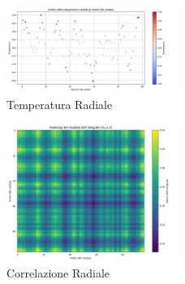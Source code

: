 \documentclass{article}
\begin{document}
\begin{figure}[H]
    \centering
    \includegraphics[width=0.5\textwidth]{"images/2m10_2_temperature_sferic.png"}
    \caption{Temperatura Radiale}
\end{figure}
\begin{figure}[H]
    \centering
    \includegraphics[width=0.5\textwidth]{"images/2m10_2_temperature_correlation_sferic.png"}
    \caption{Correlazione Radiale}
\end{figure}
\end{document}
